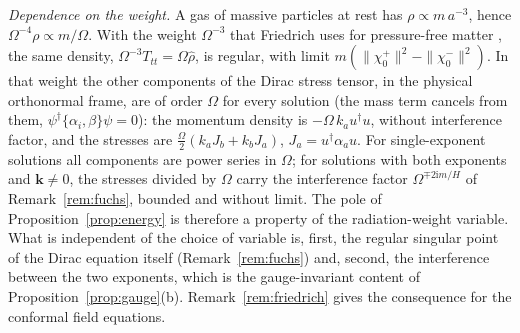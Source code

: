 \documentclass[11pt,a4paper]{article}
\theoremstyle{definition}
\newcommand{\ii}{\mathrm{i}}
\begin{document}
\emph{Dependence on the weight.} A gas of massive particles at rest has $\rho\propto m\,a^{-3}$, hence $\Omega^{-4}\rho\propto m/\Omega$. With the weight $\Omega^{-3}$ that Friedrich uses for pressure-free matter \cite{Friedrich2017}, the same density, $\Omega^{-3}T_{tt}=\Omega\hat\rho$, is regular, with limit $m(\|\chi_{0}^{+}\|^{2}-\|\chi_{0}^{-}\|^{2})$. In that weight the other components of the Dirac stress tensor, in the physical orthonormal frame, are of order $\Omega$ for every solution (the mass term cancels from them, $\psi^{\dagger}\{\alpha_{i},\beta\}\psi=0$): the momentum density is $-\Omega\,k_{a}u^{\dagger}u$, without interference factor, and the stresses are $\tfrac{\Omega}{2}(k_{a}J_{b}+k_{b}J_{a})$, $J_{a}=u^{\dagger}\alpha_{a}u$. For single-exponent solutions all components are power series in $\Omega$; for solutions with both exponents and $\mathbf{k}\neq0$, the stresses divided by $\Omega$ carry the interference factor $\Omega^{\mp2\ii m/H}$ of Remark~\ref{rem:fuchs}, bounded and without limit. The pole of Proposition~\ref{prop:energy} is therefore a property of the radiation-weight variable. What is independent of the choice of variable is, first, the regular singular point of the Dirac equation itself (Remark~\ref{rem:fuchs}) and, second, the interference between the two exponents, which is the gauge-invariant content of Proposition~\ref{prop:gauge}(b). Remark~\ref{rem:friedrich} gives the consequence for the conformal field equations.
\end{document}
